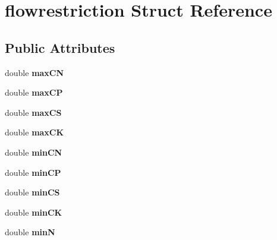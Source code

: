 \hypertarget{structflowrestriction}{\section{flowrestriction Struct Reference}
\label{structflowrestriction}
}
\subsection*{Public Attributes}
\begin{DoxyCompactItemize}
\item 
\hypertarget{structflowrestriction_aa0b1c491f1b84db8691635a8cec799ca}{double {\bfseries max\-C\-N}}\label{structflowrestriction_aa0b1c491f1b84db8691635a8cec799ca}

\item 
\hypertarget{structflowrestriction_ab428cc5afc93c6482294f53437f9ed48}{double {\bfseries max\-C\-P}}\label{structflowrestriction_ab428cc5afc93c6482294f53437f9ed48}

\item 
\hypertarget{structflowrestriction_a168481ef96b1a2f9300387cd7d30f34a}{double {\bfseries max\-C\-S}}\label{structflowrestriction_a168481ef96b1a2f9300387cd7d30f34a}

\item 
\hypertarget{structflowrestriction_ade18a89f3a169cfb82eee2293edaa6dc}{double {\bfseries max\-C\-K}}\label{structflowrestriction_ade18a89f3a169cfb82eee2293edaa6dc}

\item 
\hypertarget{structflowrestriction_a1657a3a9fa90fc38e211b20332b9dc6d}{double {\bfseries min\-C\-N}}\label{structflowrestriction_a1657a3a9fa90fc38e211b20332b9dc6d}

\item 
\hypertarget{structflowrestriction_a2ba08af7d639c741843435e692e872c8}{double {\bfseries min\-C\-P}}\label{structflowrestriction_a2ba08af7d639c741843435e692e872c8}

\item 
\hypertarget{structflowrestriction_acb0345ce2369b2bb1f5447a8d584dc6a}{double {\bfseries min\-C\-S}}\label{structflowrestriction_acb0345ce2369b2bb1f5447a8d584dc6a}

\item 
\hypertarget{structflowrestriction_ae52744e350e1daed6eb3180cc23d6c7b}{double {\bfseries min\-C\-K}}\label{structflowrestriction_ae52744e350e1daed6eb3180cc23d6c7b}

\item 
\hypertarget{structflowrestriction_a5979f2ba69ed11a3b35ca03b580b9a85}{double {\bfseries min\-N}}\label{structflowrestriction_a5979f2ba69ed11a3b35ca03b580b9a85}


\end{DoxyCompactItemize}
